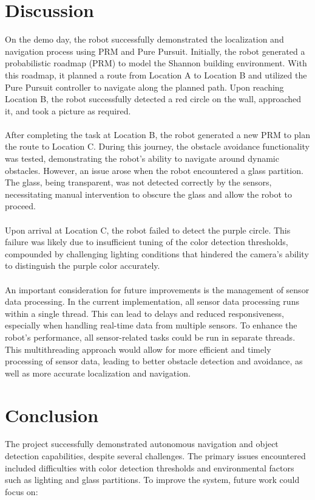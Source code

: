 \documentclass{article}
\begin{document}
	\section{Discussion}
	On the demo day, the robot successfully demonstrated the localization and navigation process using PRM and Pure Pursuit. Initially, the robot generated a probabilistic roadmap (PRM) to model the Shannon building environment. With this roadmap, it planned a route from Location A to Location B and utilized the Pure Pursuit controller to navigate along the planned path. Upon reaching Location B, the robot successfully detected a red circle on the wall, approached it, and took a picture as required.
	\\\\
	After completing the task at Location B, the robot generated a new PRM to plan the route to Location C. During this journey, the obstacle avoidance functionality was tested, demonstrating the robot's ability to navigate around dynamic obstacles. However, an issue arose when the robot encountered a glass partition. The glass, being transparent, was not detected correctly by the sensors, necessitating manual intervention to obscure the glass and allow the robot to proceed.
	\\\\
	Upon arrival at Location C, the robot failed to detect the purple circle. This failure was likely due to insufficient tuning of the color detection thresholds, compounded by challenging lighting conditions that hindered the camera's ability to distinguish the purple color accurately.
	\\\\
	An important consideration for future improvements is the management of sensor data processing. In the current implementation, all sensor data processing runs within a single thread. This can lead to delays and reduced responsiveness, especially when handling real-time data from multiple sensors. To enhance the robot's performance, all sensor-related tasks could be run in separate threads. This multithreading approach would allow for more efficient and timely processing of sensor data, leading to better obstacle detection and avoidance, as well as more accurate localization and navigation.
	\section{Conclusion}
	The project successfully demonstrated autonomous navigation and object detection capabilities, despite several challenges. The primary issues encountered included difficulties with color detection thresholds and environmental factors such as lighting and glass partitions. To improve the system, future work could focus on:
	
\end{document}
